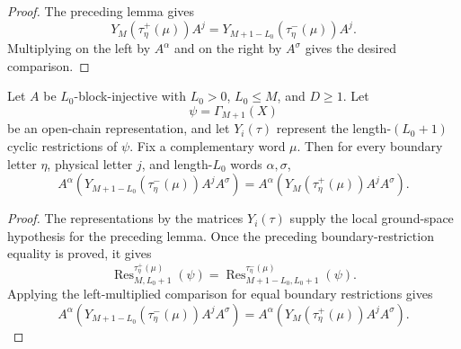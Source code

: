 \begin{proof}
    \leanok
    The preceding lemma gives
    \[
        Y_M(\tau^+_\eta(\mu))A^j
        =
        Y_{M+1-L_0}(\tau^-_\eta(\mu))A^j .
    \]
    Multiplying on the left by $A^\alpha$ and on the right by $A^\sigma$
    gives the desired comparison.
\end{proof}

\begin{theorem}
    \label{thm:closure_property_wrapped_mirror_left_word_products_ground_space}
    \leanok
    Let $A$ be $L_0$-block-injective with $L_0>0$, $L_0\le M$, and
    $D\ge1$. Let
    \[
        \psi=\Gamma_{M+1}(X)
    \]
    be an open-chain representation, and let $Y_i(\tau)$ represent the
    length-$(L_0+1)$ cyclic restrictions of $\psi$. Fix a complementary word
    $\mu$. Then for every boundary letter $\eta$, physical letter $j$, and
    length-$L_0$ words $\alpha,\sigma$,
    \[
        A^\alpha
        \left(Y_{M+1-L_0}(\tau^-_\eta(\mu))A^jA^\sigma\right)
        =
        A^\alpha
        \left(Y_M(\tau^+_\eta(\mu))A^jA^\sigma\right).
    \]
\end{theorem}

\begin{proof}
    \notready
    The representations by the matrices $Y_i(\tau)$ supply the local
    ground-space hypothesis for the preceding lemma.
    Once the preceding boundary-restriction equality is proved, it gives
    \[
        \operatorname{Res}^{\tau^+_\eta(\mu)}_{M,L_0+1}(\psi)
        =
        \operatorname{Res}^{\tau^-_\eta(\mu)}_{M+1-L_0,L_0+1}(\psi).
    \]
    Applying the left-multiplied comparison for equal boundary restrictions
    gives
    \[
        A^\alpha
        \left(Y_{M+1-L_0}(\tau^-_\eta(\mu))A^jA^\sigma\right)
        =
        A^\alpha
        \left(Y_M(\tau^+_\eta(\mu))A^jA^\sigma\right).
    \]
\end{proof}


